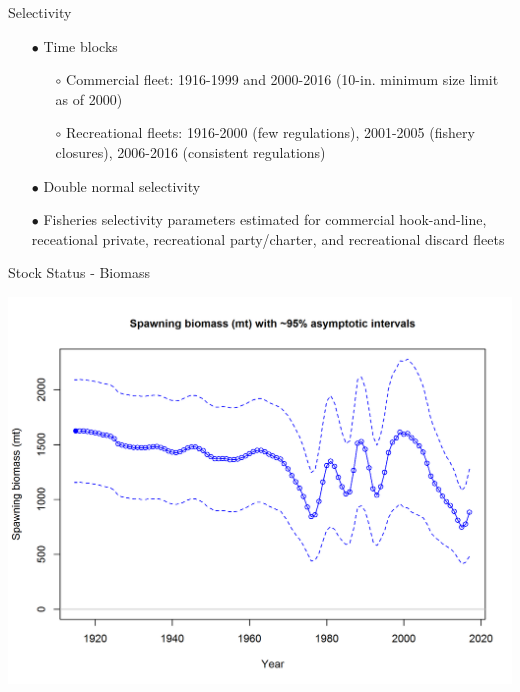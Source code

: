 \documentclass[ignorenonframetext,]{beamer}
\begin{document}
\begin{frame}{Selectivity}

\begin{itemize}
\item[$\bullet$] Time blocks
\begin{itemize}
\item[$\circ$] Commercial fleet: 1916-1999 and 2000-2016 (10-in. minimum size limit as of 2000)
\item[$\circ$] Recreational fleets: 1916-2000 (few regulations), 2001-2005 (fishery closures), 2006-2016 (consistent regulations)
\end{itemize}
\item[$\bullet$] Double normal selectivity
\item[$\bullet$] Fisheries selectivity parameters estimated for commercial hook-and-line, receational private, recreational party/charter, and recreational discard fleets
\end{itemize}

\end{frame}

\begin{frame}{Stock Status - Biomass}

\centering
\includegraphics{r4ss/plots_mod1/ts7_Spawning_biomass_(mt)_with_95_asymptotic_intervals_intervals.png}

\end{frame}
\end{document}
